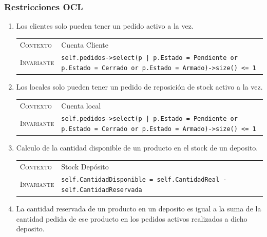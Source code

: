 \subsubsection{Restricciones OCL}

\begin{enumerate}
    \item Los clientes solo pueden tener un pedido activo a la vez.

    \begin{center}
    \begin{tabular}{p{} p{}}
        \textsc{Contexto} & Cuenta Cliente \\
        \textsc{Invariante} & \texttt{self.pedidos->select(p | p.Estado =
        Pendiente or p.Estado = Cerrado or p.Estado = Armado)->size() <= 1} \\
    \end{tabular}
    \end{center}

    \item Los locales solo pueden tener un pedido de reposición de stock activo a la vez.

    \begin{center}
    \begin{tabular}{p{} p{}}
        \textsc{Contexto} & Cuenta local \\
        \textsc{Invariante} & \texttt{self.pedidos->select(p | p.Estado =
        Pendiente or p.Estado = Cerrado or p.Estado = Armado)->size() <= 1} \\
    \end{tabular}
    \end{center}

    \item Calculo de la cantidad disponible de un producto en el stock de un deposito.

    \begin{center}
    \begin{tabular}{p{} p{}}
        \textsc{Contexto} & Stock Depósito \\
        \textsc{Invariante} & \texttt{self.CantidadDisponible = self.CantidadReal - self.CantidadReservada} \\
    \end{tabular}
    \end{center}

    \item La cantidad reservada de un producto en un deposito es igual a la suma de la cantidad pedida de ese producto en los pedidos activos realizados a dicho deposito.


\end{enumerate}
